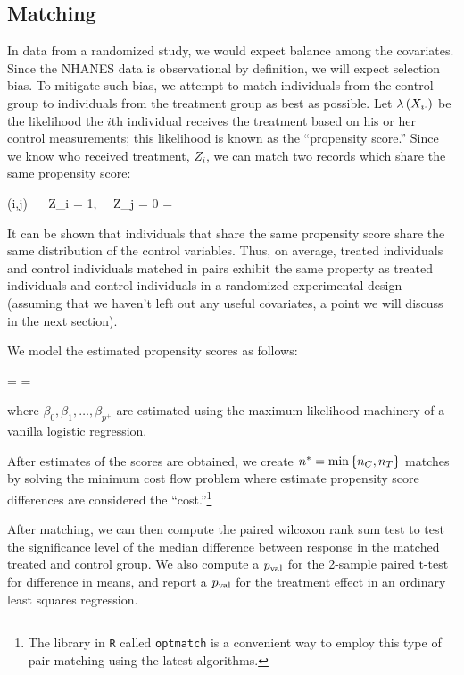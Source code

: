 \documentclass[12pt]{article}
\begin{document}
\subsection{Matching}

In data from a randomized study, we would expect balance among the covariates. Since the NHANES data is observational by definition, we will expect selection bias. To mitigate such bias, we attempt to match individuals from the control group to individuals from the treatment group as best as possible. Let $\lambda\left(X_{i \cdot}\right)$ be the likelihood the $i$th individual receives the treatment based on his or her control measurements; this likelihood is known as the ``propensity score.'' Since we know who received treatment, $Z_i$, we can match two records which share the same propensity score:

\beqn
(i,j) ~~  \quad Z_i = 1,~~ Z_j = 0 \mathand {} = 
\eeqn

It can be shown that individuals that share the same propensity score share the same distribution of the control variables. Thus, on average, treated individuals and control individuals matched in pairs exhibit the same property as treated individuals and control individuals in a randomized experimental design (assuming that we haven't left out any useful covariates, a point we will discuss in the next section).

We model the estimated propensity scores as follows:

\beqn
{} =  \approx {} = 
\eeqn

where $\beta_0, \beta_1, \ldots, \beta_{p^+}$ are estimated using the maximum likelihood machinery of a vanilla logistic regression.

After estimates of the scores are obtained, we create $n^* = \min\left\{n_C, n_T\right\}$ matches by solving the minimum cost flow problem where estimate propensity score differences are considered the ``cost.''\footnote{The library in \texttt{R} called \texttt{optmatch} is a convenient way to employ this type of pair matching using the latest algorithms.}

After matching, we can then compute the paired wilcoxon rank sum test to test the significance level of the median difference between response in the matched treated and control group. We also compute a $p_{\text{val}}$ for the 2-sample paired t-test for difference in means, and report a $p_{\text{val}}$ for the treatment effect in an ordinary least squares regression.
\end{document}
